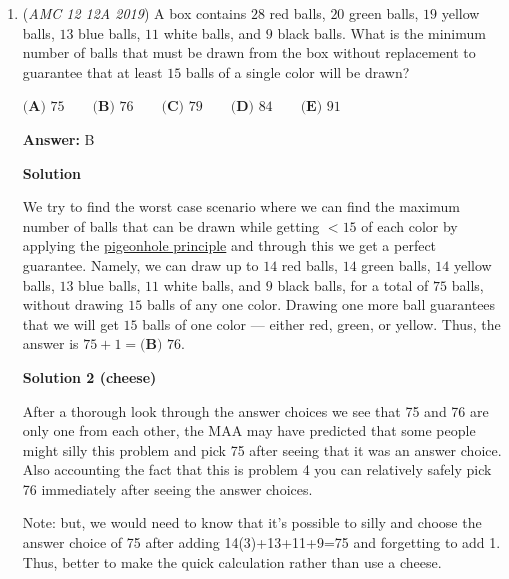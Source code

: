 \begin{enumerate}
 



\textbf{Solution 4 (similar to Solution 2)}

Without loss of generality, let $b=2$. Then, we have $a=3$ and $3b=6$. This gives $\frac{3b}{a}=\frac{6}{3}=2$, so $3b$ is $200\%$ of $a$, so the answer is $\boxed{\textbf{(D) }200\%}$.

 


	\item (\textit{AMC 12 12A 2019}) A box contains $28$ red balls, $20$ green balls, $19$ yellow balls, $13$ blue balls, $11$ white balls, and $9$ black balls. What is the minimum number of balls that must be drawn from the box without replacement to guarantee that at least $15$ balls of a single color will be drawn?


 $\textbf{(A) } 75 \qquad\textbf{(B) } 76 \qquad\textbf{(C) } 79 \qquad\textbf{(D) } 84 \qquad\textbf{(E) } 91$

 \textbf{Answer: }B



\textbf{Solution}

We try to find the worst case scenario where we can find the maximum number of balls that can be drawn while getting $<15$ of each color by applying the \href{https://artofproblemsolving.com/wiki/index.php?title=Pigeonhole\_principle}{pigeonhole principle} and through this we get a perfect guarantee. Namely, we can draw up to $14$ red balls, $14$ green balls, $14$ yellow balls, $13$ blue balls, $11$ white balls, and $9$ black balls, for a total of $75$ balls, without drawing $15$ balls of any one color. Drawing one more ball guarantees that we will get $15$ balls of one color — either red, green, or yellow. Thus, the answer is $75 + 1 = \boxed{\textbf{(B) } 76}$.

 



\textbf{Solution 2 (cheese)}

After a thorough look through the answer choices we see that 75 and 76 are only one from each other, the MAA may have predicted that some people might silly this problem and pick 75 after seeing that it was an answer choice. Also accounting the fact that this is problem 4 you can relatively safely pick 76 immediately after seeing the answer choices.

 
Note: but, we would need to know that it's possible to silly and choose the answer choice of 75 after adding 14(3)+13+11+9=75 and forgetting to add 1. Thus, better to make the quick calculation rather than use a cheese.


\end{enumerate}

